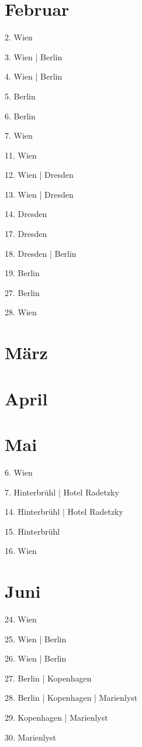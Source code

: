 \documentclass[twoside=false,titlepage=false,open=any, parskip=never, fontsize=10pt, headings=small, chapterprefix=false, appendixprefix=false, DIV=15]{scrbook}
\begin{document}
\begin{multicols}{3}
            \section*{Februar}
            2. Wien\par
            3. Wien | Berlin\par
            4. Wien | Berlin\par
            5. Berlin\par
            6. Berlin\par
            7. Wien\par
            11. Wien\par
            12. Wien | Dresden\par
            13. Wien | Dresden\par
            14. Dresden\par
            17. Dresden\par
            18. Dresden | Berlin\par
            19. Berlin\par
            27. Berlin\par
            28. Wien\par
            \section*{März}
            \section*{April}
            \section*{Mai}
            6. Wien\par
            7. Hinterbrühl | Hotel Radetzky\par
            14. Hinterbrühl | Hotel Radetzky\par
            15. Hinterbrühl\par
            16. Wien\par
            \section*{Juni}
            24. Wien\par
            25. Wien | Berlin\par
            26. Wien | Berlin\par
            27. Berlin | Kopenhagen\par
            28. Berlin | Kopenhagen | Marienlyst\par
            29. Kopenhagen | Marienlyst\par
            30. Marienlyst\par

\end{multicols}
\end{document}
